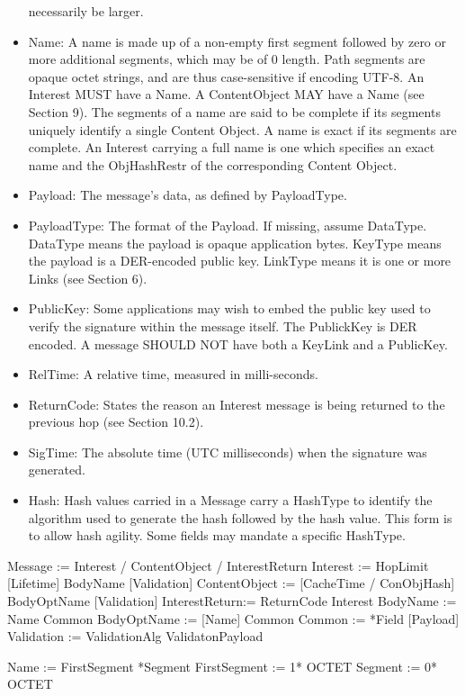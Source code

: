 \documentclass[12pt]{report}
\begin{document}
\begin{itemize}
   necessarily be larger.
\item Name: A name is made up of a non-empty first segment followed by
    zero or more additional segments, which may be of 0 length.  Path
    segments are opaque octet strings, and are thus case-sensitive if
    encoding UTF-8.  An Interest MUST have a Name.  A ContentObject
    MAY have a Name (see Section 9).  The segments of a name are said
    to be complete if its segments uniquely identify a single Content
    Object.  A name is exact if its segments are complete.  An
    Interest carrying a full name is one which specifies an exact name
    and the ObjHashRestr of the corresponding Content Object.
\item Payload: The message's data, as defined by PayloadType.
\item PayloadType: The format of the Payload.  If missing, assume
   DataType.  DataType means the payload is opaque application bytes.
   KeyType means the payload is a DER-encoded public key.  LinkType
   means it is one or more Links (see Section 6).
\item PublicKey: Some applications may wish to embed the public key used
   to verify the signature within the message itself.  The PublickKey
   is DER encoded.  A message SHOULD NOT have both a KeyLink and a
   PublicKey.
\item RelTime: A relative time, measured in milli-seconds.
\item ReturnCode: States the reason an Interest message is being
   returned to the previous hop (see Section 10.2).
\item SigTime: The absolute time (UTC milliseconds) when the signature
   was generated.
\item Hash: Hash values carried in a Message carry a HashType to
   identify the algorithm used to generate the hash followed by the
   hash value.  This form is to allow hash agility.  Some fields may
   mandate a specific HashType.
\end{itemize}

Message       := Interest / ContentObject / InterestReturn
Interest      := HopLimit [Lifetime] BodyName [Validation]
ContentObject := [CacheTime / ConObjHash] BodyOptName [Validation]
InterestReturn:= ReturnCode Interest
BodyName      := Name Common
BodyOptName   := [Name] Common
Common        := *Field [Payload]
Validation    := ValidationAlg ValidatonPayload

Name          := FirstSegment *Segment
FirstSegment  := 1* OCTET
Segment       := 0* OCTET
\end{document}
